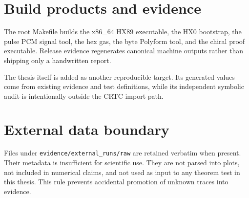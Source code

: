 \section{Build products and evidence}
The root Makefile builds the x86\_64 HX89 executable, the HX0 bootstrap, the pulse PCM signal tool, the hex gas, the byte Polyform tool, and the chiral proof executable. Release evidence regenerates canonical machine outputs rather than shipping only a handwritten report.

The thesis itself is added as another reproducible target. Its generated values come from existing evidence and test definitions, while its independent symbolic audit is intentionally outside the CRTC import path.

\section{External data boundary}
Files under \texttt{evidence/external\_runs/raw} are retained verbatim when present. Their metadata is insufficient for scientific use. They are not parsed into plots, not included in numerical claims, and not used as input to any theorem test in this thesis. This rule prevents accidental promotion of unknown traces into evidence.
